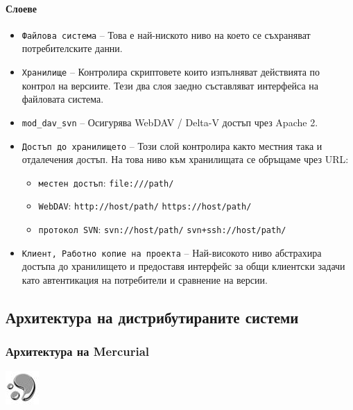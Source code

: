 \documentclass[a4paper]{article}
\def\Hg{Mercurial}
\begin{document}
    \paragraph{Слоеве}

    \begin{itemize}
      \item \texttt{Файлова система} -- Това е най-ниското ниво на което се
      съхраняват потребителските данни.
      \item \texttt{Хранилище} -- Контролира скриптовете които изпълняват действията по
      контрол на версиите. Тези два слоя заедно съставляват интерфейса на
      файловата система.
      \item \texttt{mod\_dav\_svn} -- Осигурява WebDAV / Delta-V достъп чрез Apache 2.
      \item \texttt{Достъп до хранилището} -- Този слой контролира както местния
      така и отдалечения достъп. На това ниво към хранилищата се обръщаме чрез
      URL:
        \begin{itemize}
          \item \texttt{местен достъп}: \texttt{file:///path/}
          \item \texttt{WebDAV}: \texttt{http://host/path/} \quad \texttt{https://host/path/}
          \item \texttt{протокол SVN}: \texttt{svn://host/path/} \quad \texttt{svn+ssh://host/path/}
        \end{itemize}
      \item \texttt{Клиент, Работно копие на проекта} -- Най-високото ниво абстрахира
      достъпа до хранилището и предоставя интерфейс за общи клиентски задачи
      като автентикация на потребители и сравнение на версии.
    \end{itemize}

  \subsection{Архитектура на дистрибутираните системи}

    \subsubsection{Архитектура на \Hg}
    \includegraphics[scale=1.0]{hg_icon}
\end{document}
